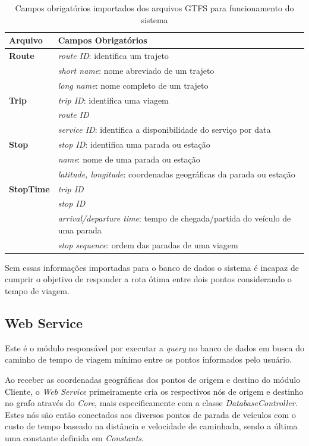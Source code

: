 \begin{table}[!htb]
	\centering
	\caption{Campos obrigatórios importados dos arquivos GTFS para funcionamento do sistema}
	\label{tab:campos_obrigatorios}
	\begin{tabular}{ll}
		\hline
		\textbf{Arquivo} & \textbf{Campos Obrigatórios} \\
		\hline
		\textbf{Route} & \emph{route ID}: identifica um trajeto \\
				    & \emph{short name}: nome abreviado de um trajeto \\
				    & \emph{long name}: nome completo de um trajeto \\
		\textbf{Trip} & \emph{trip ID}: identifica uma viagem \\ 
				& \emph{route ID} \\ 
				& \emph{service ID}: identifica a disponibilidade do serviço por data \\
		\textbf{Stop} & \emph{stop ID}: identifica uma parada ou estação \\
				 & \emph{name}: nome de uma parada ou estação \\
				 & \emph{latitude, longitude}: coordenadas geográficas da parada ou estação \\
		\textbf{StopTime} & \emph{trip ID} \\
				         & \emph{stop ID} \\
				         & \emph{arrival/departure time}: tempo de chegada/partida do veículo de uma parada \\
				         & \emph{stop sequence}: ordem das paradas de uma viagem \\
		\hline
	\end{tabular}
\end{table}

Sem essas informações importadas para o banco de dados o sistema é incapaz de cumprir o objetivo de responder a rota ótima entre dois pontos considerando o tempo de viagem.

\subsection{Web Service}
Este é o módulo responsável por executar a \emph{query} no banco de dados em busca do caminho de tempo de viagem mínimo entre os pontos informados pelo usuário.
 
Ao receber as coordenadas geográficas dos pontos de origem e destino do módulo Cliente, o \emph{Web Service} primeiramente cria os respectivos nós de origem e destinho no grafo através do \emph{Core}, mais especificamente com a classe \emph{DatabaseController}.
Estes nós são então conectados aos diversos pontos de parada de veículos com o custo de tempo baseado na distância e velocidade de caminhada, sendo a última uma constante definida em \emph{Constants}.
 
